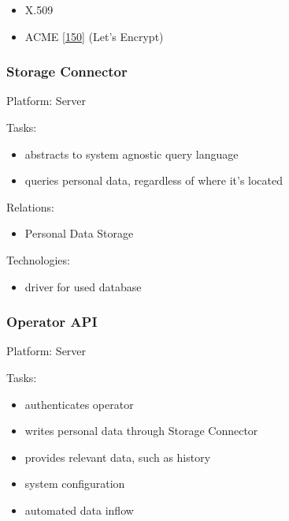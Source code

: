 \documentclass[12pt,english,a4paper,titlepage,cleardoublepage=empty,dottedtoc]{report}
\providecommand{\tightlist}{%
  \setlength{\itemsep}{0pt}\setlength{\parskip}{0pt}}
\begin{document}
\begin{itemize}
\tightlist
\item
  X.509
\item
  ACME {[}\protect\hyperlink{ref-web_spec_acme}{150}{]} (Let's Encrypt)
\end{itemize}

\subsubsection*{Storage Connector}\label{storage-connector}

Platform: Server

Tasks:

\begin{itemize}
\tightlist
\item
  abstracts to system agnostic query language
\item
  queries personal data, regardless of where it's located
\end{itemize}

Relations:

\begin{itemize}
\tightlist
\item
  Personal Data Storage
\end{itemize}

Technologies:

\begin{itemize}
\tightlist
\item
  driver for used database
\end{itemize}

\subsubsection*{Operator API}\label{operator-api}

Platform: Server

Tasks:

\begin{itemize}
\tightlist
\item
  authenticates operator
\item
  writes personal data through Storage Connector
\item
  provides relevant data, such as history
\item
  system configuration
\item
  automated data inflow
\end{itemize}
\end{document}
